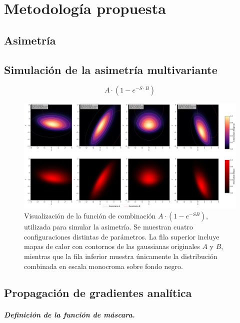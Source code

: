 \chapter{Metodología propuesta}\label{chapter:proposal}
\section{Asimetría}

\section{Simulación de la asimetría multivariante}

\begin{equation}
    A \cdot (1-e^{-S \cdot B})
\end{equation}

\begin{figure}[htbp]
    \centering
    \includegraphics[width=1\textwidth]{Graphics/splatts.png}
    \caption{Visualización de la función de combinación \(A \cdot (1 - e^{-S B})\), utilizada para simular la asimetría. 
    Se muestran cuatro configuraciones distintas de parámetros. 
    La fila superior incluye mapas de calor con contornos de las gaussianas originales \(A\) y \(B\), 
    mientras que la fila inferior muestra únicamente la distribución combinada en escala monocroma sobre fondo negro.}
    \label{fig:gaussianas_2d_skewness}
\end{figure}

    
\section{Propagación de gradientes analítica}


\paragraph{Definición de la función de máscara.}

